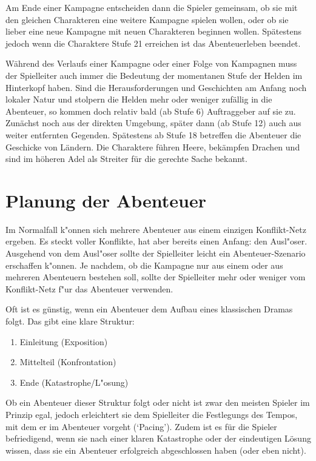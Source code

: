 Am Ende einer Kampagne entscheiden dann die Spieler gemeinsam, ob sie mit den gleichen Charakteren eine weitere Kampagne spielen wollen, oder ob sie lieber eine neue Kampagne mit neuen Charakteren beginnen wollen. Spätestens jedoch wenn die Charaktere Stufe 21 erreichen ist das Abenteuerleben beendet.

Während des Verlaufs einer Kampagne oder einer Folge von Kampagnen muss der Spielleiter auch immer die Bedeutung der momentanen Stufe der Helden im Hinterkopf haben. Sind die Herausforderungen und Geschichten am Anfang noch lokaler Natur und stolpern die Helden mehr oder weniger zufällig in die Abenteuer, so kommen doch relativ bald (ab Stufe 6) Auftraggeber auf sie zu. Zunächst noch aus der direkten Umgebung, später dann (ab Stufe 12) auch aus weiter entfernten Gegenden. Spätestens ab Stufe 18 betreffen die Abenteuer die Geschicke von Ländern. Die Charaktere führen Heere, bekämpfen Drachen und sind im höheren Adel als Streiter für die gerechte Sache bekannt.





\section{Planung der Abenteuer}
Im Normalfall k"onnen sich mehrere Abenteuer aus einem einzigen Konflikt-Netz ergeben. Es steckt voller Konflikte, hat aber bereits einen Anfang: den Ausl"oser. Ausgehend von dem Ausl"oser sollte der Spielleiter leicht ein Abenteuer-Szenario erschaffen k"onnen. Je nachdem, ob die Kampagne nur aus einem oder aus mehreren Abenteuern bestehen soll, sollte der Spielleiter mehr oder weniger vom Konflikt-Netz f"ur das Abenteuer verwenden.

Oft ist es günstig, wenn ein Abenteuer dem Aufbau eines klassischen Dramas folgt. Das gibt eine klare Struktur:
\begin{enumerate}
  \item Einleitung (Exposition)
  \item Mittelteil (Konfrontation)
  \item Ende (Katastrophe/L"osung)
\end{enumerate}
Ob ein Abenteuer dieser Struktur folgt oder nicht ist zwar den meisten Spieler im Prinzip egal, jedoch erleichtert sie dem Spielleiter die Festlegungs des Tempos, mit dem er im Abenteuer vorgeht (`Pacing'). Zudem ist es für die Spieler befriedigend, wenn sie nach einer klaren Katastrophe oder der eindeutigen Lösung wissen, dass sie ein Abenteuer erfolgreich abgeschlossen haben (oder eben nicht).

